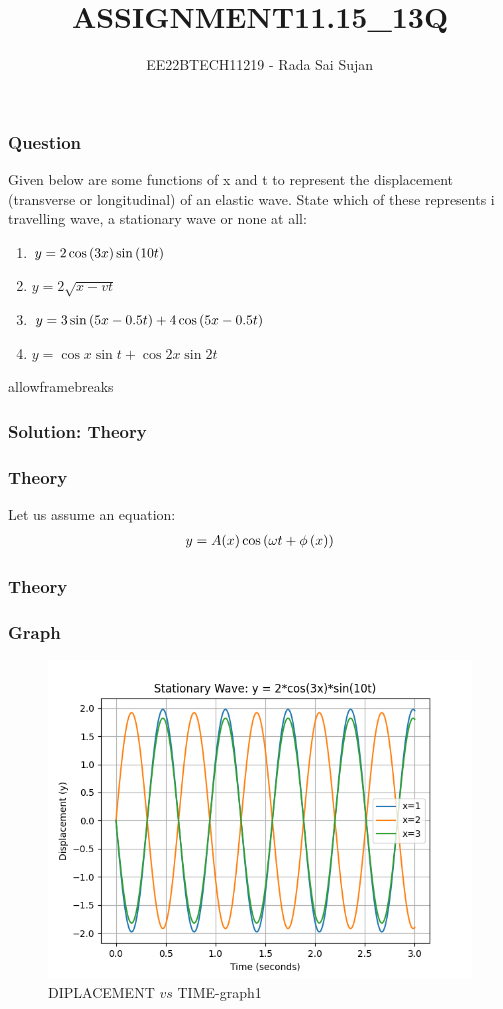 \documentclass{beamer}
\begin{document}
\title{ASSIGNMENT11.15\_13Q}
\author{EE22BTECH11219 - Rada Sai Sujan$^{}$%
}
\frame{\titlepage}

\begin{frame}
\frametitle{Question}
Given below are some functions of x and t to 
represent the displacement (transverse
or longitudinal) of an elastic wave. State which of these represents \brak i travelling
wave,  a stationary wave or  none at all: \\
\begin{enumerate}
\item $y = 2\cos \left(3x\right) \sin \left(10t\right)$
\item $y=2\sqrt{x-vt}$
\item $y = 3\sin \left(5x - 0.5t\right) + 4\cos \left(5x - 0.5t\right)$
\item $y = \cos x \sin t + \cos 2x \sin 2t$
\end{enumerate}
\end{frame}

\begin{frame}{allowframebreaks}
\frametitle{Solution: Theory}

\end{frame}

\begin{frame}
\frametitle{Theory}
Let us assume an equation:
\begin{align}
y=A(x)\cos \left(\omega t+\phi\left(x\right)\right)
\end{align}
\end{frame}

\begin{frame}
\frametitle{Theory}

\end{frame}

\begin{frame}
\frametitle{Graph}
\begin{figure}[ht]
                        \centering
                        \includegraphics[width=\columnwidth]{figs/a.png}
                        \caption{DIPLACEMENT $vs$ TIME-graph1}
                        \label{fig:1}
\end{figure}
\end{frame}
\end{document}
